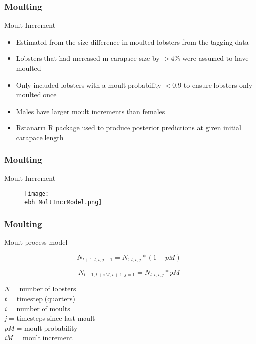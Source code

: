 \documentclass{beamer}
\newcommand{\ebh}{\string~/bio.data/bio.lobster/figures/LFA3438Framework2019/} %
\begin{document}
\begin{frame}
\frametitle{Moulting}
Moult Increment 
\begin{itemize}
\item Estimated from the size difference in moulted lobsters from the tagging data
\item Lobsters that had increased in carapace size by $>$4\% were assumed to have moulted
\item Only included lobsters with a moult probability $<$0.9 to ensure lobsters only moulted once 
\item Males have larger moult increments than females
\item Rstanarm R package used to produce posterior predictions at given initial carapace length
\end{itemize}
\end{frame}


\begin{frame}
\frametitle{Moulting}
Moult Increment 
\begin{figure}
        \begin{center}
            \texttt{[image: \\ebh MoltIncrModel.png]}
        \end{center}
    \end{figure}
\end{frame}


\begin{frame}
\frametitle{Moulting}
Moult process model 

\begin{equation*}
    N_{t+1, l, i, j+1} = N_{t, l, i, j} * (1 - pM)
\end{equation*}


\begin{equation*}
    N_{t+1, l+iM, i+1, j=1} = N_{t, l, i, j} * pM
\end{equation*}



\textit{N} = number of lobsters\\
\textit{t} = timestep (quarters)\\
\textit{i} = number of moults\\
\textit{j} = timesteps since last moult\\
\textit{pM} = moult probability\\
\textit{iM} = moult increment


\end{frame}
\end{document}
